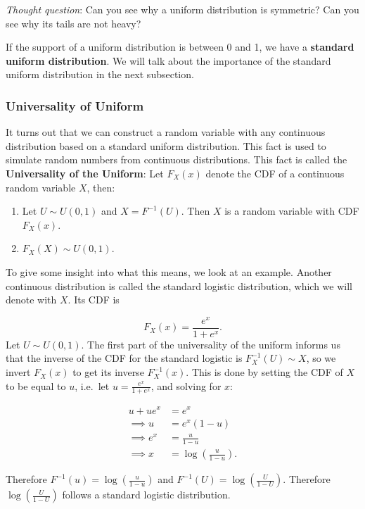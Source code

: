 \documentclass[
]{book}
\providecommand{\tightlist}{%
  \setlength{\itemsep}{0pt}\setlength{\parskip}{0pt}}
\begin{document}
\emph{Thought question}: Can you see why a uniform distribution is symmetric? Can you see why its tails are not heavy?

If the support of a uniform distribution is between 0 and 1, we have a \textbf{standard uniform distribution}. We will talk about the importance of the standard uniform distribution in the next subsection.

\subsubsection{Universality of Uniform}\label{universality-of-uniform}

It turns out that we can construct a random variable with any continuous distribution based on a standard uniform distribution. This fact is used to simulate random numbers from continuous distributions. This fact is called the \textbf{Universality of the Uniform}: Let \(F_X(x)\) denote the CDF of a continuous random variable \(X\), then:

\begin{enumerate}
\def\labelenumi{\arabic{enumi}.}
\tightlist
\item
  Let \(U \sim U(0,1)\) and \(X = F^{-1}(U)\). Then \(X\) is a random variable with CDF \(F_X(x)\).
\item
  \(F_X(X) \sim U(0,1)\).
\end{enumerate}

To give some insight into what this means, we look at an example. Another continuous distribution is called the standard logistic distribution, which we will denote with \(X\). Its CDF is

\[
F_X(x) = \frac{e^x}{1+e^x}.
\]
Let \(U \sim U(0,1)\). The first part of the universality of the uniform informs us that the inverse of the CDF for the standard logistic is \(F_X^{-1}(U) \sim X\), so we invert \(F_X(x)\) to get its inverse \(F_X^{-1}(x)\). This is done by setting the CDF of \(X\) to be equal to \(u\), i.e.~let \(u = \frac{e^x}{1+e^x}\), and solving for \(x\):

\[
\begin{split}
u + u e^x &= e^x\\
\implies u &= e^x (1-u) \\
\implies e^x &= \frac{u}{1-u} \\
\implies x &= \log (\frac{u}{1-u}).
\end{split}
\]

Therefore \(F^{-1}(u) = \log (\frac{u}{1-u})\) and \(F^{-1}(U) = \log (\frac{U}{1-U})\). Therefore \(\log (\frac{U}{1-U})\) follows a standard logistic distribution.
\end{document}
